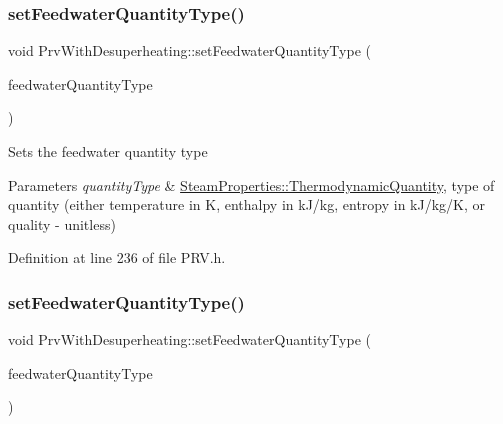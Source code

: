 \subsubsection{\texorpdfstring{set\+Feedwater\+Quantity\+Type()}{setFeedwaterQuantityType()}\hspace{0.1cm}{\footnotesize\ttfamily [2/3]}}
{\footnotesize\ttfamily void Prv\+With\+Desuperheating\+::set\+Feedwater\+Quantity\+Type (\begin{DoxyParamCaption}\item[{\hyperlink{class_steam_properties_ae0294bedf7d178c2d8fb6aed0f62fbff}{Steam\+Properties\+::\+Thermodynamic\+Quantity}}]{feedwater\+Quantity\+Type }\end{DoxyParamCaption})\hspace{0.3cm}{\ttfamily [inline]}}

Sets the feedwater quantity type


\begin{DoxyParams}{Parameters}
{\em quantity\+Type} & \hyperlink{class_steam_properties_ae0294bedf7d178c2d8fb6aed0f62fbff}{Steam\+Properties\+::\+Thermodynamic\+Quantity}, type of quantity (either temperature in K, enthalpy in k\+J/kg, entropy in k\+J/kg/K, or quality -\/ unitless) \\
\hline
\end{DoxyParams}


Definition at line 236 of file P\+R\+V.\+h.

\mbox{\label{class_prv_with_desuperheating_a3efaf028d1e6b8349a9e064605cc8d7a}} 
\subsubsection{\texorpdfstring{set\+Feedwater\+Quantity\+Type()}{setFeedwaterQuantityType()}\hspace{0.1cm}{\footnotesize\ttfamily [3/3]}}
{\footnotesize\ttfamily void Prv\+With\+Desuperheating\+::set\+Feedwater\+Quantity\+Type (\begin{DoxyParamCaption}\item[{\hyperlink{class_steam_properties_ae0294bedf7d178c2d8fb6aed0f62fbff}{Steam\+Properties\+::\+Thermodynamic\+Quantity}}]{feedwater\+Quantity\+Type }\end{DoxyParamCaption})\hspace{0.3cm}{\ttfamily [inline]}}

